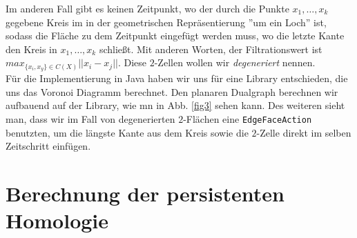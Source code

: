 \documentclass[11pt, a4paper,draft]{report}
\begin{document}
 	Im anderen Fall gibt es keinen Zeitpunkt, wo der durch die Punkte $x_1,\ldots,x_k$ gegebene Kreis
 	im in der geometrischen Repräsentierung ''um ein Loch'' ist, sodass die Fläche zu dem Zeitpunkt eingefügt werden muss, wo die letzte Kante den Kreis in $x_1,\ldots,x_k$ schließt. Mit anderen Worten, der Filtrationswert ist $max_{\{x_i,x_y\}\in C(X)}||x_i-x_j||$. Diese $2$-Zellen wollen wir \textit{degeneriert} nennen.\\
 	Für die Implementierung in Java haben wir uns für eine Library entschieden, die uns das Voronoi Diagramm berechnet. Den planaren Dualgraph berechnen wir aufbauend auf der Library, wie mn in Abb. \ref{fig3} sehen kann. Des weiteren sieht man, dass wir im Fall von degenerierten $2$-Flächen eine \texttt{EdgeFaceAction} benutzten, um die längste Kante aus dem Kreis sowie die $2$-Zelle direkt im selben Zeitschritt einfügen.
 	
 	\section{Berechnung der persistenten Homologie}
 	
 	
\end{document}
